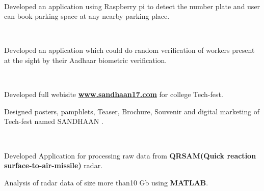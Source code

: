 \documentclass[a4paper]{deedy-resume} %
\begin{document}
\\

\begin{tightitemize}
\item Developed an application using Raspberry pi to detect the number plate and user can book parking space at any nearby parking place.
\end{tightitemize}
\sectionspace

\\

\begin{tightitemize}
\item Developed an application which could do random verification of workers present at the sight by their Aadhaar biometric verification.

\end{tightitemize}
\sectionspace
{}\\

\begin{tightitemize}
\item Developed full webisite \href{http://www.sandhaan17.com} {\bf www.sandhaan17.com}  for college Tech-fest.
\item Designed posters, pamphlets, Teaser, Brochure, Souvenir and digital marketing of Tech-fest named SANDHAAN .
\end{tightitemize}
\sectionspace
 \\

\begin{tightitemize}
\item Developed Application for processing  raw data from \textbf{ QRSAM(Quick reaction surface-to-air-missile)} radar.
\item Analysis of radar data of size more than10 Gb using \textbf{MATLAB}.
\end{tightitemize}
\end{document}
